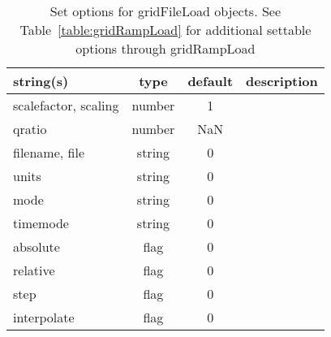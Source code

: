 \begin{table}[ht]
\centering
\begin{tabular}{p{5cm} c c p{7cm}}
\hline
string(s) & type & default & description \\
\hline
scalefactor, scaling & number & 1 & \\
qratio & number & NaN & \\
filename, file & string & 0 & \\
units & string & 0 & \\
mode & string & 0 & \\
timemode & string & 0 & \\
absolute & flag & 0 & \\
relative & flag & 0 & \\
step & flag & 0 & \\
interpolate & flag & 0 & \\
\hline
\end{tabular}
\caption{Set options for gridFileLoad objects. See Table~\ref{table:gridRampLoad} for additional settable options through gridRampLoad}
\label{table:gridFileLoad}
\end{table}
